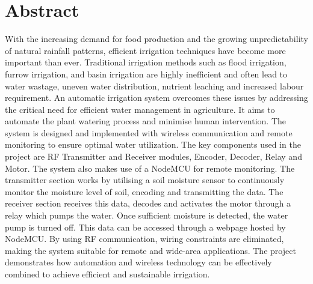 \chapter*{Abstract}
With the increasing demand for food production and the growing unpredictability of natural rainfall patterns, efficient irrigation techniques have become more important than ever. Traditional irrigation methods such as flood irrigation, furrow irrigation, and basin irrigation are highly inefficient and often lead to water wastage, uneven water distribution, nutrient leaching and increased labour requirement. An automatic irrigation system overcomes these issues by addressing the critical need for efficient water management in agriculture. It aims to automate the plant watering process and minimise human intervention. The system is designed and implemented with wireless communication and remote monitoring to ensure optimal water utilization. The key components used in the project are RF Transmitter and Receiver modules, Encoder, Decoder, Relay and Motor. The system also makes use of a NodeMCU for remote monitoring. The transmitter section works by utilising a soil moisture sensor to continuously monitor the moisture level of soil, encoding and transmitting the data. The receiver section receives this data, decodes and activates the motor through a relay which pumps the water. Once sufficient moisture is detected, the water pump is turned off. This data can be accessed through a webpage hosted by NodeMCU. By using RF communication, wiring constraints are eliminated, making the system suitable for remote and wide-area applications. The project demonstrates how automation and wireless technology can be effectively combined to achieve efficient and sustainable irrigation.
